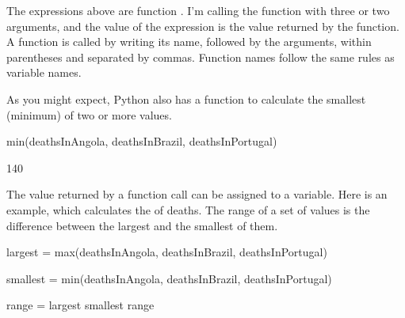 \documentclass[letterpaper,10pt,english]{sphinxmanual}
\begin{document}
The expressions above are function . I’m calling the  function with three or two arguments, and the value of the expression is the value returned by the function. A function is called by writing its name, followed by the arguments, within parentheses and separated by commas. Function names follow the same rules as variable names.

As you might expect, Python also has a function to calculate the smallest (minimum) of two or more values.


{
\begin{sphinxVerbatim}[commandchars=\\\{\}]
\llap{\color{nbsphinxin}[ ]:\,\hspace{\fboxrule}\hspace{\fboxsep}}

min(deathsInAngola, deathsInBrazil, deathsInPortugal)

\end{sphinxVerbatim}
}


{
\begin{sphinxVerbatim}[commandchars=\\\{\}]
\llap{\color{nbsphinxin}[ ]:\,\hspace{\fboxrule}\hspace{\fboxsep}}
140
\end{sphinxVerbatim}
}

The value returned by a function call can be assigned to a variable. Here is an example, which calculates the  of deaths. The range of a set of values is the difference between the largest and the smallest of them.


{
\begin{sphinxVerbatim}[commandchars=\\\{\}]
\llap{\color{nbsphinxin}[ ]:\,\hspace{\fboxrule}\hspace{\fboxsep}}

largest = max(deathsInAngola, deathsInBrazil, deathsInPortugal)


smallest = min(deathsInAngola, deathsInBrazil, deathsInPortugal)

range = largest \PYGZhy{} smallest
range
\end{sphinxVerbatim}
}
\end{document}
